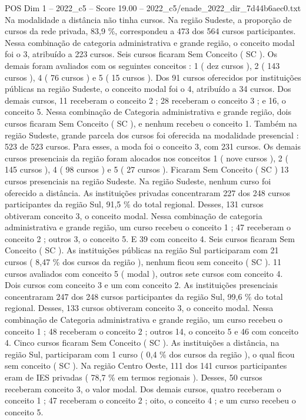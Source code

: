\begin{textsample}{POS Dim 1 – 2022\_c5 – Score 19.00 – 2022\_c5/enade\_2022\_dir\_7d44b6aec0.txt}
Na modalidade a distância não tinha cursos.
Na região Sudeste, a proporção de cursos da rede privada, 83,9 \%, correspondeu a 473 dos 564 cursos participantes.
Nessa combinação de categoria administrativa e grande região, o conceito modal foi o 3, atribuído a 223 cursos.
Seis cursos ficaram Sem Conceito ( SC ).
Os demais foram avaliados com os seguintes conceitos : 1 ( dez cursos ), 2 ( 143 cursos ), 4 ( 76 cursos ) e 5 ( 15 cursos ).
Dos 91 cursos oferecidos por instituições públicas na região Sudeste, o conceito modal foi o 4, atribuído a 34 cursos.
Dos demais cursos, 11 receberam o conceito 2 ; 28 receberam o conceito 3 ; e 16, o conceito 5.
Nessa combinação de Categoria administrativa e grande região, dois cursos ficaram Sem Conceito ( SC ), e nenhum recebeu o conceito 1.
Também na região Sudeste, grande parcela dos cursos foi oferecida na modalidade presencial : 523 de 523 cursos.
Para esses, a moda foi o conceito 3, com 231 cursos.
Os demais cursos presenciais da região foram alocados nos conceitos 1 ( nove cursos ), 2 ( 145 cursos ), 4 ( 98 cursos ) e 5 ( 27 cursos ).
Ficaram Sem Conceito ( SC ) 13 cursos presenciais na região Sudeste.
Na região Sudeste, nenhum curso foi oferecido a distância.
As instituições privadas concentraram 227 dos 248 cursos participantes da região Sul, 91,5 \% do total regional.
Desses, 131 cursos obtiveram conceito 3, o conceito modal.
Nessa combinação de categoria administrativa e grande região, um curso recebeu o conceito 1 ; 47 receberam o conceito 2 ; outros 3, o conceito 5.
E 39 com conceito 4.
Seis cursos ficaram Sem Conceito ( SC ).
As instituições públicas na região Sul participaram com 21 cursos ( 8,47 \% dos cursos da região ), nenhum ficou sem conceito ( SC ). 11 cursos avaliados com conceito 5 ( modal ), outros sete cursos com conceito 4.
Dois cursos com conceito 3 e um com conceito 2.
As instituições presenciais concentraram 247 dos 248 cursos participantes da região Sul, 99,6 \% do total regional.
Desses, 133 cursos obtiveram conceito 3, o conceito modal.
Nessa combinação de Categoria administrativa e grande região, um curso recebeu o conceito 1 ; 48 receberam o conceito 2 ; outros 14, o conceito 5 e 46 com conceito 4.
Cinco cursos ficaram Sem Conceito ( SC ).
As instituições a distância, na região Sul, participaram com 1 curso ( 0,4 \% dos cursos da região ), o qual ficou sem conceito ( SC ).
Na região Centro Oeste, 111 dos 141 cursos participantes eram de IES privadas ( 78,7 \% em termos regionais ).
Desses, 50 cursos receberam conceito 3, o valor modal.
Dos demais cursos, quatro receberam o conceito 1 ; 47 receberam o conceito 2 ; oito, o conceito 4 ; e um curso recebeu o conceito 5.

\end{textsample}
